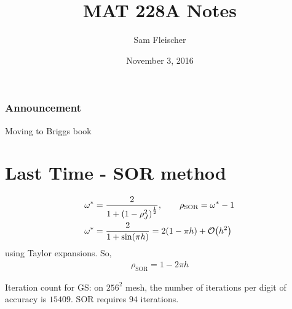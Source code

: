 \documentclass{article}
\title{MAT 228A Notes}
\author{Sam Fleischer}
\date{November 3, 2016}
\begin{document}
    \maketitle

    \subsubsection{Announcement}
        Moving to Briggs book

    \section{Last Time - SOR method}
        \begin{align}
            \omega^* &= \frac{2}{1 + \qty(1 - \rho_J^2)^\frac{1}{2}}, \qquad \rho_\text{SOR} = \omega^* - 1 \\
            \omega^* &= \frac{2}{1 + \sin(\pi h)} = 2\qty(1 - \pi h) + \order{h^2}
        \end{align}
        using Taylor expansions.  So,
        \begin{align}
            \rho_\text{SOR} = 1 - 2\pi h
        \end{align}

        Iteration count for GS: on $256^2$ mesh, the number of iterations per digit of accuracy is $15409$.  SOR requires $94$ iterations.
\end{document}
